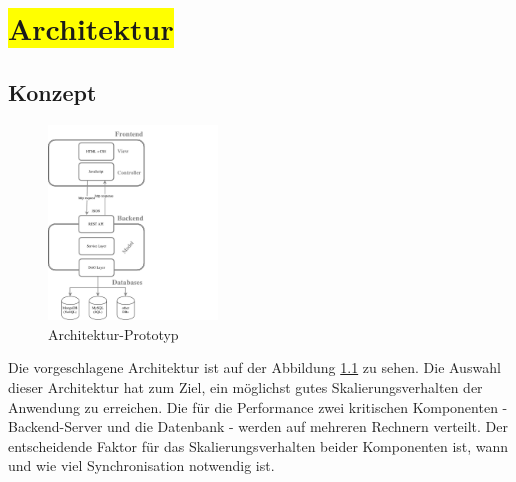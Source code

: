 \chapter{\colorbox{yellow}{Architektur}}

\section{Konzept}

\begin{figure}
\begin{center}
\vspace{-40pt}%
 \includegraphics[trim = 0mm 0mm 0mm 0mm, clip, width=0.4\textwidth]{resources/architectureMyAppWithoutFrameworks}	
 \caption[Architektur-Prototyp]{Architektur-Prototyp}
 \label{img:architectureMyApp}
 \vspace{-70pt}%
 \end{center}
 \end{figure}


%
%
Die vorgeschlagene Architektur ist auf der Abbildung \ref{img:architectureMyApp} zu sehen. Die Auswahl dieser Architektur hat zum Ziel, ein möglichst gutes Skalierungsverhalten der Anwendung zu erreichen. Die für die Performance zwei kritischen Komponenten - Backend-Server und die Datenbank - werden auf mehreren Rechnern verteilt. Der entscheidende Faktor für das Skalierungsverhalten beider Komponenten ist, wann und wie viel Synchronisation notwendig ist. 

